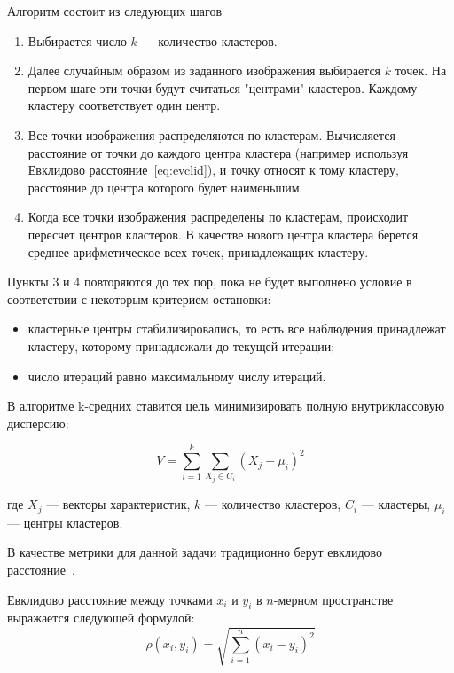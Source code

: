 Алгоритм состоит из следующих шагов~\cite{defcluctering}

\begin{enumerate}
	\item Выбирается число \( k \) --- количество кластеров.
	\item Далее случайным образом из заданного изображения выбирается \( k \) точек. На первом шаге эти точки будут считаться "центрами" кластеров. Каждому кластеру соответствует один центр.
	\item Все точки изображения распределяются по кластерам. Вычисляется расстояние от точки до каждого центра кластера (например используя Евклидово расстояние~\ref{eq:evclid}), и точку относят к тому кластеру, расстояние до центра которого будет наименьшим.
	\item Когда все точки изображения распределены по кластерам, происходит пересчет центров кластеров. В качестве нового центра кластера берется среднее арифметическое всех точек, принадлежащих кластеру.
\end{enumerate}

Пункты 3 и 4 повторяются до тех пор, пока не будет выполнено условие в соответствии с некоторым критерием остановки:
\begin{itemize}
	\item кластерные центры стабилизировались, то есть все наблюдения принадлежат кластеру, которому принадлежали до текущей итерации;
	\item число итераций равно максимальному числу итераций.
\end{itemize}

В алгоритме k-средних ставится цель минимизировать полную внутриклассовую дисперсию:

\begin{equation}
	V = \sum_{i=1}^{k} \sum_{X_j \in C_i} (X_j - \mu_i)^2
	\label{eq:disperion}
\end{equation}

где \(X_j\) --- векторы характеристик, \(k\) --- количество кластеров, \(C_i\) --- кластеры, \(\mu_i\) --- центры кластеров.


В качестве метрики для данной задачи традиционно берут евклидово расстояние~\cite{defcluctering, pruf_clustering, feature_representations}.

Евклидово расстояние между точками $x_i$ и $y_i$ в $n$-мерном пространстве выражается следующей формулой:
\begin{equation}
	\rho(x_i, y_i) = \sqrt{\sum_{i=1}^{n} (x_i - y_i)^2}
	\label{eq:evclid}
\end{equation}

